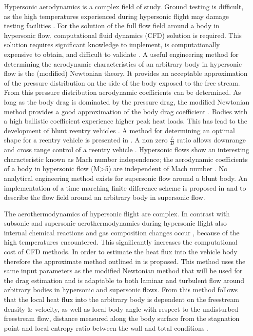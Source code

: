 Hypersonic aerodynamics is a complex field of study. Ground testing is difficult, as the high temperatures experienced during hypersonic flight may damage testing facilities \cite{Anderson2002} \cite{Bertin1994}. For the solution of the full flow field around a body in hypersonic flow, computational fluid dynamics (CFD) solution is required. This solution requires significant knowledge to implement, is computationally expensive to obtain, and difficult to validate \cite{Anderson2002} \cite{Bertin1994}. A useful engineering method for determining the aerodynamic characteristics of an arbitrary body in hypersonic flow is the (modified) Newtonian theory. It provides an acceptable approximation of the pressure distribution on the side of the body exposed to the free stream. From this pressure distribution aerodynamic coefficients can be determined. As long as the body drag is dominated by the pressure drag, the modified Newtonian method provides a good approximation of the body drag coefficient \cite{Anderson2002} \cite{Bertin1994} \cite{Bertin2006}. Bodies with a high ballistic coefficient experience higher peak heat loads. This has lead to the development of blunt reentry vehicles\cite{Bertin1994} \cite{Theisinger2009}. A method for determining an optimal shape for a reentry vehicle is presented in \cite{Theisinger2009}. A non zero $\frac{L}{D}$ ratio allows downrange and cross range control of a reentry vehicle \cite{Theisinger2009}. Hypersonic flows show an interesting characteristic known as Mach number independence; the aerodynamic coefficients of a body in hypersonic flow (M>5) are independent of Mach number \cite{Bertin1994,AndersonJr.2007,Hollis}. No analytical engineering method exists for supersonic flow around a blunt body. An implementation of a time marching finite difference scheme is proposed in \cite{AndersonJr.2007} and \cite{AndersonJr.2006} to describe the flow field around an arbitrary body in supersonic flow. 

The aerothermodynamics of hypersonic flight are complex. In contrast with subsonic and supersonic aerothermodynamics during hypersonic flight also internal chemical reactions and gas composition changes occur \cite{AndersonJr.2006}, because of the high temperatures encountered. This significantly increases the computational cost of CFD methods. In order to estimate the heat flux into the vehicle body therefore the approximate method outlined in \cite{Tauber1986} \cite{AndersonJr.2006} is proposed. This method uses the same input parameters as the modified Newtonian method that will be used for the drag estimation and is adaptable to both laminar and turbulent flow around arbitrary bodies in hypersonic and supersonic flows. From this method follows that the local heat flux into the arbitrary body is dependent on the freestream density \& velocity, as well as local body angle with respect to the undisturbed freestream flow, distance measured along the body surface from the stagnation point and local entropy ratio between the wall and total conditions \cite{Tauber1986} \cite{AndersonJr.2006}.